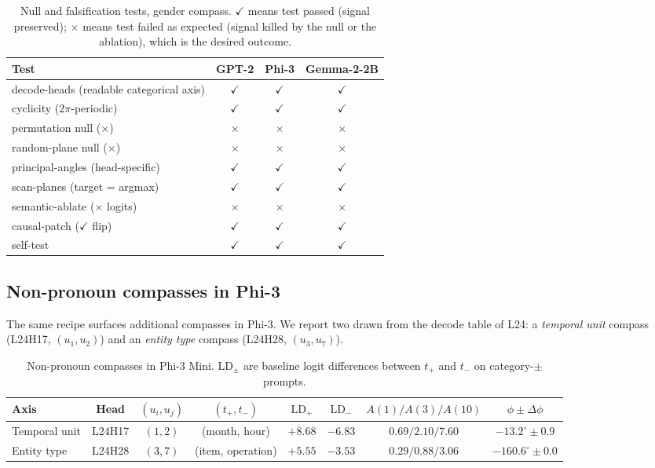 \begin{table}[h]
\centering
\small
\caption{Null and falsification tests, gender compass. $\checkmark$ means
test passed (signal preserved); $\times$ means test failed as expected
(signal killed by the null or the ablation), which is the desired outcome.}
\label{tab:nulls}
\begin{tabular}{lccc}
\toprule
Test & GPT-2 & Phi-3 & Gemma-2-2B \\
\midrule
decode-heads (readable categorical axis) & $\checkmark$ & $\checkmark$ & $\checkmark$ \\
cyclicity ($2\pi$-periodic)              & $\checkmark$ & $\checkmark$ & $\checkmark$ \\
permutation null ($\times$)              & $\times$     & $\times$     & $\times$     \\
random-plane null ($\times$)             & $\times$     & $\times$     & $\times$     \\
principal-angles (head-specific)         & $\checkmark$ & $\checkmark$ & $\checkmark$ \\
scan-planes (target = argmax)            & $\checkmark$ & $\checkmark$ & $\checkmark$ \\
semantic-ablate ($\times$ logits)        & $\times$     & $\times$     & $\times$     \\
causal-patch ($\checkmark$ flip)         & $\checkmark$ & $\checkmark$ & $\checkmark$ \\
self-test                                & $\checkmark$ & $\checkmark$ & $\checkmark$ \\
\bottomrule
\end{tabular}
\end{table}

\subsection{Non-pronoun compasses in Phi-3}
\label{sec:other}

The same recipe surfaces additional compasses in Phi-3. We report two
drawn from the decode table of L24: a \emph{temporal unit} compass
(L24H17, $(u_1, u_2)$) and an \emph{entity type} compass
(L24H28, $(u_3, u_7)$).

\begin{table}[h]
\centering
\small
\caption{Non-pronoun compasses in Phi-3 Mini.
$\mathrm{LD}_\pm$ are baseline logit differences between $t_{+}$ and $t_{-}$
on category-$\pm$ prompts.}
\label{tab:nonpronoun}
\begin{tabular}{lccccccc}
\toprule
Axis & Head & $(u_i,u_j)$ & $(t_{+},t_{-})$ &
$\mathrm{LD}_{+}$ & $\mathrm{LD}_{-}$ &
$A(1)/A(3)/A(10)$ & $\phi\pm\Delta\phi$ \\
\midrule
Temporal unit & L24H17 & $(1,2)$ & (month, hour) &
$+8.68$ & $-6.83$ & $0.69/2.10/7.60$ & $-13.2^\circ\pm 0.9$ \\
Entity type   & L24H28 & $(3,7)$ & (item, operation) &
$+5.55$ & $-3.53$ & $0.29/0.88/3.06$ & $-160.6^\circ\pm 0.0$ \\
\bottomrule
\end{tabular}
\end{table}

